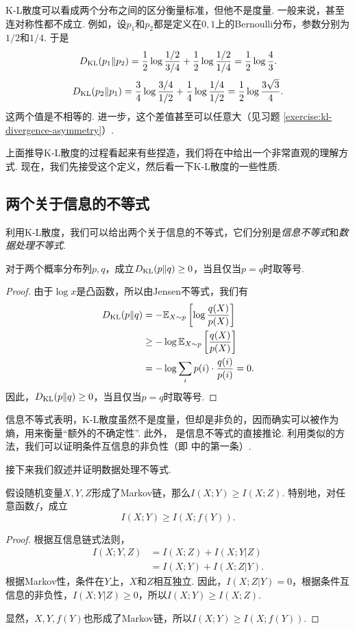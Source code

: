 K-L散度可以看成两个分布之间的区分衡量标准，但他不是度量. 一般来说，甚至连对称性都不成立. 例如，设$p_1$和$p_2$都是定义在$0,1$上的Bernoulli分布，参数分别为$1/2$和$1/4$. 于是
\[D_{\mathrm{KL}}(p_1\Vert p_2) = \frac12\log\frac{1/2}{3/4} + \frac12\log\frac{1/2}{1/4} = \frac12\log\frac43.\]
\[D_{\mathrm{KL}}(p_2\Vert p_1) = \frac34\log\frac{3/4}{1/2} + \frac14\log\frac{1/4}{1/2} = \frac12\log\frac{3\sqrt3}{4}.\]
这两个值是不相等的. 进一步，这个差值甚至可以任意大（见习题 \ref{exercise:kl-divergence-asymmetry}）.

上面推导K-L散度的过程看起来有些捏造，我们将在中给出一个非常直观的理解方式. 现在，我们先接受这个定义，然后看一下K-L散度的一些性质.

\subsection{两个关于信息的不等式}
利用K-L散度，我们可以给出两个关于信息的不等式，它们分别是\textit{信息不等式}和\textit{数据处理不等式}.

\begin{theorem}[信息不等式]\label{thm:information-inequality}
    对于两个概率分布列$p,q$，成立$D_{\mathrm{KL}}(p\Vert q)\geq0$，当且仅当$p=q$时取等号.
\end{theorem}
\begin{proof}
    由于$\log x$是凸函数，所以由Jensen不等式，我们有
    \begin{align*}
        D_{\mathrm{KL}}(p\Vert q)&=-\mathbb{E}_{X\sim p}\left[\log\frac{q(X)}{p(X)}\right]\\
        &\geq-\log \mathbb{E}_{X\sim p}\left[\frac{q(X)}{p(X)}\right]\\
        &=-\log\sum_ip(i)\cdot\frac{q(i)}{p(i)}=0.
    \end{align*}
    因此，$D_{\mathrm{KL}}(p\Vert q)\geq0$，当且仅当$p=q$时取等号.
\end{proof}

信息不等式表明，K-L散度虽然不是度量，但却是非负的，因而确实可以被作为熵，用来衡量“额外的不确定性”. 此外， 是信息不等式的直接推论. 利用类似的方法，我们可以证明条件互信息的非负性（即 中的第一条）.

接下来我们叙述并证明数据处理不等式.
\begin{theorem}[数据处理不等式]\label{thm:data-processing-inequality}
    假设随机变量$X,Y,Z$形成了Markov链，那么$I(X;Y)\geq I(X;Z)$. 特别地，对任意函数$f$，成立
    \[I(X;Y)\geq I(X;f(Y)).\]
\end{theorem}
\begin{proof}
根据互信息链式法则，
    \begin{align*}
        I(X;Y,Z)&=I(X;Z)+I(X;Y|Z)\\
        &=I(X;Y)+I(X;Z|Y).
    \end{align*}
根据Markov性，条件在$Y$上，$X$和$Z$相互独立. 因此，$I(X;Z|Y)=0$，根据条件互信息的非负性，$I(X;Y|Z)\geq0$，所以$I(X;Y)\geq I(X;Z)$.

显然，$X,Y,f(Y)$也形成了Markov链，所以$I(X;Y)\geq I(X;f(Y))$.
\end{proof}

